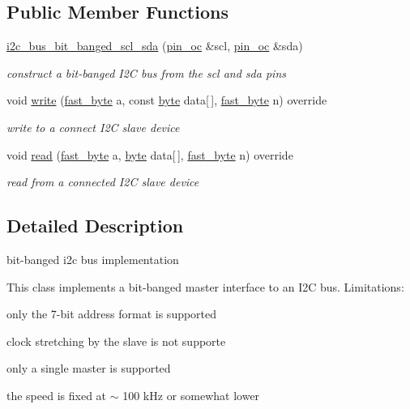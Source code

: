 \subsection*{Public Member Functions}
\begin{DoxyCompactItemize}
\item 
\hyperlink{classhwlib_1_1i2c__bus__bit__banged__scl__sda_aff6b11113640da8c8f04b60081bef5ae}{i2c\+\_\+bus\+\_\+bit\+\_\+banged\+\_\+scl\+\_\+sda} (\hyperlink{classhwlib_1_1pin__oc}{pin\+\_\+oc} \&scl, \hyperlink{classhwlib_1_1pin__oc}{pin\+\_\+oc} \&sda)
\begin{DoxyCompactList}\small\item\em construct a bit-\/banged I2C bus from the scl and sda pins \end{DoxyCompactList}\item 
void \hyperlink{classhwlib_1_1i2c__bus__bit__banged__scl__sda_a7f030dbd80fee19a6e6a9846e998d411}{write} (\hyperlink{hwlib-defines_8hpp_a54998f25522db04b7b797b0fcc9eb3d5}{fast\+\_\+byte} a, const \hyperlink{hwlib-defines_8hpp_ab8ef12fab634c171394422d0ee8baf94}{byte} data\mbox{[}$\,$\mbox{]}, \hyperlink{hwlib-defines_8hpp_a54998f25522db04b7b797b0fcc9eb3d5}{fast\+\_\+byte} n) override
\begin{DoxyCompactList}\small\item\em write to a connect I2C slave device \end{DoxyCompactList}\item 
void \hyperlink{classhwlib_1_1i2c__bus__bit__banged__scl__sda_a3936c0c4052692b999cf46c9cb12868b}{read} (\hyperlink{hwlib-defines_8hpp_a54998f25522db04b7b797b0fcc9eb3d5}{fast\+\_\+byte} a, \hyperlink{hwlib-defines_8hpp_ab8ef12fab634c171394422d0ee8baf94}{byte} data\mbox{[}$\,$\mbox{]}, \hyperlink{hwlib-defines_8hpp_a54998f25522db04b7b797b0fcc9eb3d5}{fast\+\_\+byte} n) override
\begin{DoxyCompactList}\small\item\em read from a connected I2C slave device \end{DoxyCompactList}\end{DoxyCompactItemize}


\subsection{Detailed Description}
bit-\/banged i2c bus implementation 

This class implements a bit-\/banged master interface to an I2C bus. Limitations\+:
\begin{DoxyItemize}
\item only the 7-\/bit address format is supported
\item clock stretching by the slave is not supporte
\item only a single master is supported
\item the speed is fixed at $\sim$ 100 k\+Hz or somewhat lower 
\end{DoxyItemize}

